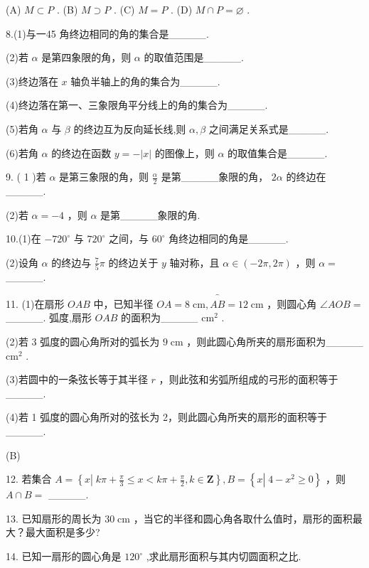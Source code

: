 \documentclass[10pt]{article}
\begin{document}
(A) \(M \subset  P\) . (B) \(M \supset  P\) . (C) \(M = P\) . (D) \(M \cap  P = \varnothing\) .

8.(1)与一45 \textdegree 角终边相同的角的集合是\_\_\_\_\_.

(2)若 \(\alpha\) 是第四象限的角，则 \(\alpha\) 的取值范围是\_\_\_\_\_.

(3)终边落在 \(x\) 轴负半轴上的角的集合为\_\_\_\_\_.

(4)终边落在第一、三象限角平分线上的角的集合为\_\_\_\_\_.

(5)若角 \(\alpha\) 与 \(\beta\) 的终边互为反向延长线,则 \(\alpha ,\beta\) 之间满足关系式是\_\_\_\_\_.

(6)若角 \(\alpha\) 的终边在函数 \(y =  - \left| x\right|\) 的图像上，则 \(\alpha\) 的取值集合是\_\_\_\_\_.

9. ( 1 )若 \(\alpha\) 是第三象限的角，则 \(\frac{\alpha }{2}\) 是第\_\_\_\_\_象限的角， \({2\alpha }\) 的终边在\_\_\_\_\_.

(2)若 \(\alpha  =  - 4\) ，则 \(\alpha\) 是第\_\_\_\_\_象限的角.

10.(1)在 \(- {720}^{ \circ  }\) 与 \({720}^{ \circ  }\) 之间，与 \({60}^{ \circ  }\) 角终边相同的角是\_\_\_\_\_.

(2)设角 \(\alpha\) 的终边与 \(\frac{7}{5}\pi\) 的终边关于 \(y\) 轴对称，且 \(\alpha  \in  \left( {-{2\pi },{2\pi }}\right)\) ，则 \(\alpha  =\) \_\_\_\_\_.

11. (1)在扇形 \({OAB}\) 中，已知半径 \({OA} = {8\mathrm{\;{cm}}},\overset{\text{ ⏜ }}{AB} = {{12}\mathrm{\;{cm}}}\) ，则圆心角 \(\angle {AOB} =\) \_\_\_\_\_. 弧度,扇形 \({OAB}\) 的面积为\_\_\_\_\_ \({\mathrm{{cm}}}^{2}\) .

(2)若 3 弧度的圆心角所对的弧长为 \(9\mathrm{\;{cm}}\) ，则此圆心角所夹的扇形面积为\_\_\_\_\_ \({\mathrm{{cm}}}^{2}\) .

(3)若圆中的一条弦长等于其半径 \(r\) ，则此弦和劣弧所组成的弓形的面积等于\_\_\_\_\_.

(4)若 1 弧度的圆心角所对的弦长为 2，则此圆心角所夹的扇形的面积等于\_\_\_\_\_.

(B)

12. 若集合 \(A = \left\{  {x\left| {\;{k\pi } + \frac{\pi }{3} \leq  x < {k\pi } + \frac{\pi }{2}}\right. ,k \in  \mathbf{Z}}\right\}  ,B = \left\{  {x\left| {\;4 - {x}^{2} \geq  0}\right. }\right\}\) ，则 \(A \cap  B =\) \_\_\_\_\_.

13. 已知扇形的周长为 \({30}\mathrm{\;{cm}}\) ，当它的半径和圆心角各取什么值时，扇形的面积最大？最大面积是多少?

14. 已知一扇形的圆心角是 \({120}^{ \circ  }\) ,求此扇形面积与其内切圆面积之比.
\end{document}
